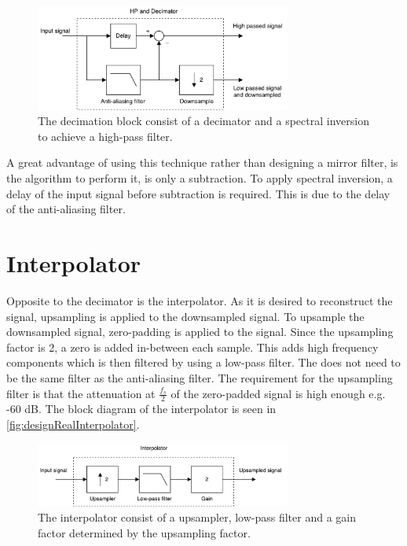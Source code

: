 \begin{figure}[H]
\centering
\includegraphics[width=0.75\textwidth]{figures/designRealDecimator.pdf}
\caption{The decimation block consist of a decimator and a spectral inversion to achieve a high-pass filter.}
\label{fig:designRealDecimator}
\end{figure}

A great advantage of using this technique rather than designing a mirror filter, is the algorithm to perform it, is only a subtraction. To apply spectral inversion, a delay of the input signal before subtraction is required. This is due to the delay of the anti-aliasing filter.


\section{Interpolator}

Opposite to the decimator is the interpolator. As it is desired to reconstruct the signal, upsampling is applied to the downsampled signal. To upsample the downsampled signal, zero-padding is applied to the signal. Since the upsampling factor is 2, a zero is added in-between each sample. This adds high frequency components which is then filtered by using a low-pass filter. The does not need to be the same filter as the anti-aliasing filter. The requirement for the upsampling filter is that the attenuation at $\frac{f_s}{2}$ of the zero-padded signal is high enough e.g. -60 dB. The block diagram of the interpolator is seen in \autoref{fig:designRealInterpolator}.

\begin{figure}[H]
\centering
\includegraphics[width=0.75\textwidth]{figures/designRealInterpolator.pdf}
\caption{The interpolator consist of a upsampler, low-pass filter and a gain factor determined by the upsampling factor.}
\label{fig:designRealInterpolator}
\end{figure}

